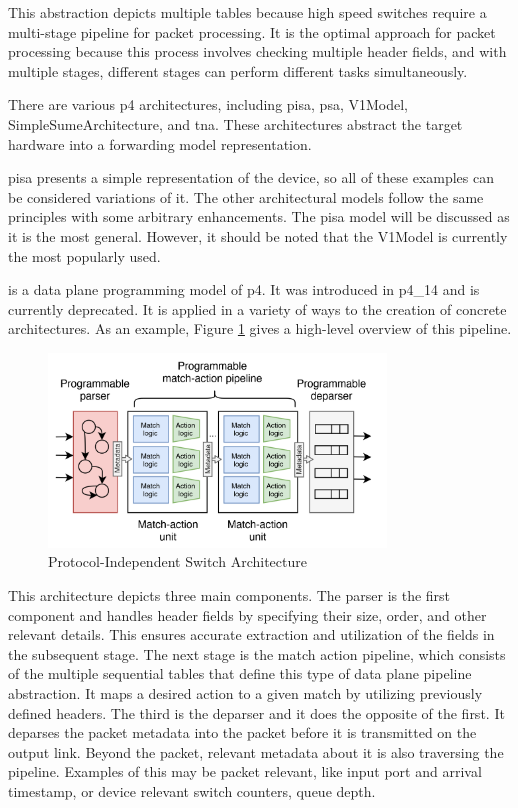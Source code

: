 This abstraction depicts multiple tables because high speed switches require a multi-stage pipeline for packet processing. It is the optimal approach for packet processing because this process involves checking multiple header fields, and with multiple stages, different stages can perform different tasks simultaneously\cite{peterson_software-defined_2021}. 

There are various \gls{p4} architectures, including \gls{pisa}, \gls{psa}, V1Model, SimpleSumeArchitecture, and \gls{tna}\cite{peterson_software-defined_2021}\cite{hauser_survey_2021}. These architectures abstract the target hardware into a forwarding model representation. 

\gls{pisa} presents a simple representation of the device, so all of these examples can be considered variations of it. The other architectural models follow the same principles with some arbitrary enhancements. The \gls{pisa} model will be discussed as it is the most general. However, it should be noted that the V1Model is currently the most popularly used.

 is a data plane programming model of \gls{p4}. It was introduced in \gls{p4}\_14 and is currently deprecated. It is applied in a variety of ways to the creation of concrete architectures\cite{hauser_survey_2021}. As an example, Figure \ref{fig:pisa_pipeline} gives a high-level overview of this pipeline. 

\begin{figure}
	\centering
	\includegraphics[width=0.8\textwidth]{Chapters/Figures/SDNs/pisa_pipeline.png}
	\caption{Protocol-Independent Switch Architecture\cite{hauser_survey_2021}}
	\label{fig:pisa_pipeline}
\end{figure}

This architecture depicts three main components. The parser is the first component and handles header fields by specifying their size, order, and other relevant details. This ensures accurate extraction and utilization of the fields in the subsequent stage. The next stage is the match action pipeline, which consists of the multiple sequential tables that define this type of data plane pipeline abstraction. It maps a desired action to a given match by utilizing previously defined headers. The third is the deparser and it does the opposite of the first. It deparses the packet metadata into the packet before it is transmitted on the output link. Beyond the packet, relevant metadata about it is also traversing the pipeline. Examples of this may be packet relevant, like input port and arrival timestamp, or device relevant switch counters, queue depth. 

